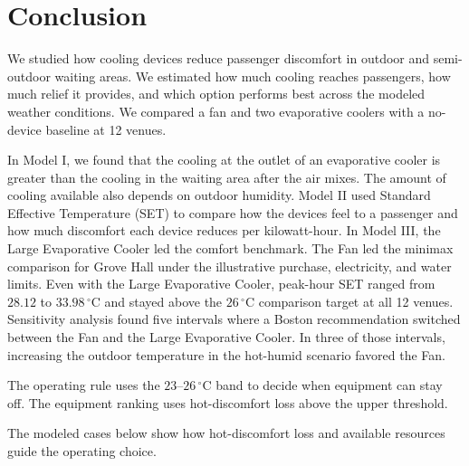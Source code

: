 \section{Conclusion}

\indent We studied how cooling devices reduce passenger discomfort in outdoor and semi-outdoor waiting areas. We estimated how much cooling reaches passengers, how much relief it provides, and which option performs best across the modeled weather conditions. We compared a fan and two evaporative coolers with a no-device baseline at 12 venues.

\indent In Model I, we found that the cooling at the outlet of an evaporative cooler is greater than the cooling in the waiting area after the air mixes. The amount of cooling available also depends on outdoor humidity. Model II used Standard Effective Temperature (SET) to compare how the devices feel to a passenger and how much discomfort each device reduces per kilowatt-hour. In Model III, the Large Evaporative Cooler led the comfort benchmark. The Fan led the minimax comparison for Grove Hall under the illustrative purchase, electricity, and water limits. Even with the Large Evaporative Cooler, peak-hour SET ranged from $28.12$ to $33.98\,^\circ\mathrm{C}$ and stayed above the $26\,^\circ\mathrm{C}$ comparison target at all 12 venues. Sensitivity analysis found five intervals where a Boston recommendation switched between the Fan and the Large Evaporative Cooler. In three of those intervals, increasing the outdoor temperature in the hot-humid scenario favored the Fan.

\indent The operating rule uses the $23$--$26\,^\circ\mathrm{C}$ band to decide when equipment can stay off. The equipment ranking uses hot-discomfort loss above the upper threshold.

\indent The modeled cases below show how hot-discomfort loss and available resources guide the operating choice.

